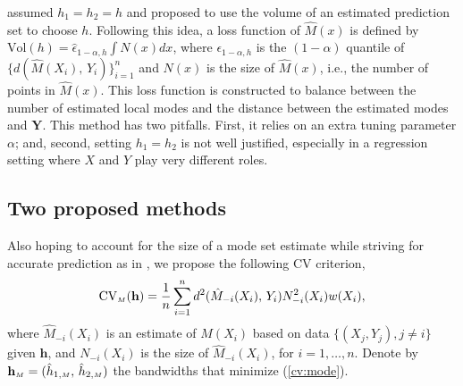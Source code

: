 \documentclass[fleqn,12pt,twoside]{article}
\newcommand{\bh}{\mathbf{h}}
\newcommand{\bY}{\mathbf{Y}}
\numberwithin{equation}{section}
\begin{document}
\cite{Chen.etal2016} assumed $h_1=h_2=h$ and proposed to use the volume of an estimated prediction set to choose $h$. Following this idea, a loss function of $\hat M(x)$ is defined by $\textrm{Vol}(h)=\hat \epsilon_{1-\alpha, h} \int N(x) dx$, where $\epsilon_{1-\alpha, h}$ is the $(1-\alpha)$ quantile of $\{d(\hat M(X_i), \, Y_i)\}_{i=1}^n$ and $N(x)$ is the size of $\hat M(x)$, i.e., the number of points in $\hat M(x)$. This loss function is constructed to balance between the number of estimated local modes and the distance between the estimated modes and $\bY$. This method has two pitfalls. First, it relies on an extra tuning parameter $\alpha$; and, second, setting $h_1=h_2$ is not well justified, especially in a regression setting where $X$ and $Y$ play very different roles. 

\subsection{Two proposed methods}
\label{s:ours}
Also hoping to account for the size of a mode set estimate while striving for accurate prediction as in \cite{Chen.etal2016}, we propose the following CV criterion, 
\begin{equation}\label{cv:mode}
\textrm{CV}_{\hbox {\tiny $M$}}(\bh) = \frac{1}{n}\sum_{i=1}^{n} d^2(\hat M_{-i}(X_i), \, Y_i) N_{-i}^2(X_i) w(X_i),
\end{equation} 
where $\hat M_{-i}(X_i)$ is an estimate of $M(X_i)$ based on data $\{(X_j, Y_j), j\neq i\}$ given $\bh$, and $N_{-i}(X_i)$ is the size of $\hat M_{-i}(X_i)$, for $i=1, \ldots, n$. Denote by $\bh_{\hbox {\tiny $M$}}=(\hat{h}_{1, \hbox {\tiny $M$}}, \, \hat{h}_{2, \hbox {\tiny $M$}})$ the bandwidths that minimize (\ref{cv:mode}). 
\end{document}
